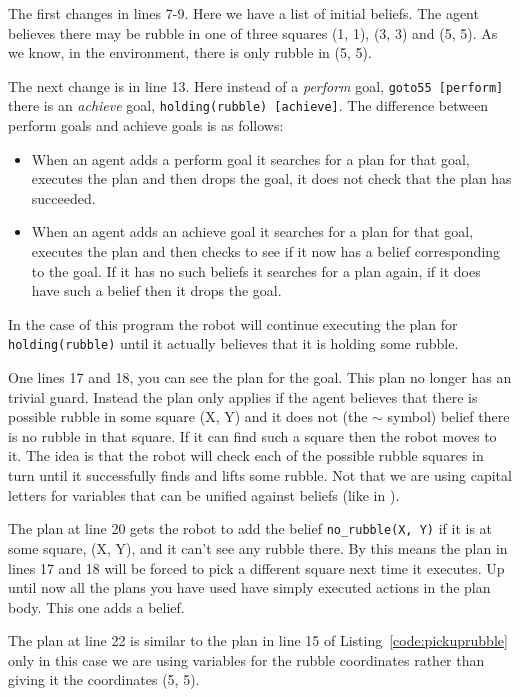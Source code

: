 \documentclass[a4]{article}
\begin{document}
The first changes in lines 7-9.  Here we have a list of initial beliefs.  The agent believes there may be rubble in one of three squares (1, 1), (3, 3) and (5, 5).  As we know, in the environment, there is only rubble in (5, 5).

The next change is in line 13.  Here instead of a \emph{perform} goal, \lstinline{goto55 [perform]} there is an \emph{achieve} goal, \lstinline{holding(rubble) [achieve]}.  The difference between perform goals and achieve goals is as follows:  
\begin{itemize}
\item When an agent adds a perform goal it searches for a plan for that goal, executes the plan and then drops the goal, it does not check that the plan has succeeded.
\item When an agent adds an achieve goal it searches for a plan for that goal, executes the plan and then checks to see if it now has a belief corresponding to the goal.  If it has no such beliefs it searches for a plan again, if it does have such a belief then it drops the goal.
\end{itemize}
In the case of this program the robot will continue executing the plan for \lstinline{holding(rubble)} until it actually believes that it is holding some rubble.

One lines 17 and 18, you can see the plan for the goal.  This plan no longer has an trivial guard.  Instead the plan only applies if the agent believes that there is possible rubble in some square (X, Y) and it does not (the $\sim$ symbol) belief there is no rubble in that square.  If it can find such a square then the robot moves to it.  The idea is that the robot will check each of the possible rubble squares  in turn until it successfully finds and lifts some rubble.  Not that we are using capital letters for variables that can be unified against beliefs (like in \prolog).

The plan at line 20 gets the robot to add the belief \lstinline{no_rubble(X, Y)} if it is at some square, (X, Y), and it can't see any rubble there.  By this means the plan in lines 17 and 18 will be forced to pick a different square next time it executes.  Up until now all the plans you have used have simply executed actions in the plan body.  This one adds a belief.

The plan at line 22 is similar to the plan in line 15 of Listing~\ref{code:pickuprubble} only in this case we are using variables for the rubble coordinates rather than giving it the coordinates (5, 5).
\end{document}
